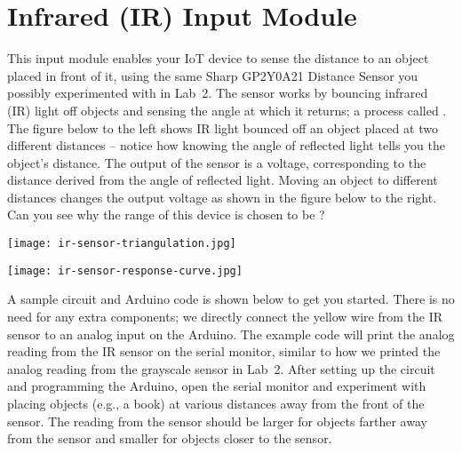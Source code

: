 
\clearpage
\section{Infrared (IR) Input Module}
\label{sec-input-ir}

This input module enables your IoT device to sense the distance to an
object placed  in front of it, using the same Sharp
GP2Y0A21 Distance Sensor you possibly experimented with in Lab~2. The
sensor works by bouncing infrared (IR) light off objects and sensing the
angle at which it returns; a process called . The
figure below to the left shows IR light bounced off an object placed at
two different distances -- notice how knowing the angle of reflected
light tells you the object's distance. The output of the sensor is a
voltage, corresponding to the distance derived from the angle of
reflected light. Moving an object to different distances changes the
output voltage as shown in the figure below to the right. Can you see
why the range of this device is chosen to be ?

\vspace{0.1in}
\begin{minipage}[t]{0.49\tw}
  \texttt{[image: ir-sensor-triangulation.jpg]}
\end{minipage}
\hfill
\begin{minipage}[t]{0.49\tw}
  \texttt{[image: ir-sensor-response-curve.jpg]}
\end{minipage}
\vspace{0.1in}

A sample circuit and Arduino code is shown below to get you started.
There is no need for any extra components; we directly connect the yellow
wire from the IR sensor to an analog input on the Arduino. The example
code will print the analog reading from the IR sensor on the serial
monitor, similar to how we printed the analog reading from the grayscale
sensor in Lab~2. After setting up the circuit and programming the
Arduino, open the serial monitor and experiment with placing objects
(e.g., a book) at various distances away from the front of the sensor.
The reading from the sensor should be larger for objects farther away
from the sensor and smaller for objects closer to the sensor.

